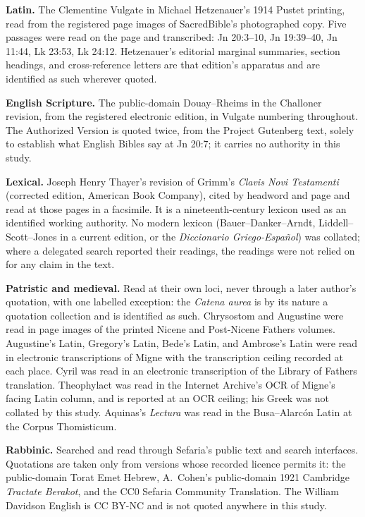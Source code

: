\textbf{Latin.} The Clementine Vulgate in Michael Hetzenauer's 1914 Pustet
printing, read from the registered page images of SacredBible's photographed
copy. Five passages were read on the page and transcribed: Jn 20:3--10, Jn
19:39--40, Jn 11:44, Lk 23:53, Lk 24:12. Hetzenauer's editorial marginal
summaries, section headings, and cross-reference letters are that edition's
apparatus and are identified as such wherever quoted.

\textbf{English Scripture.} The public-domain Douay--Rheims in the Challoner
revision, from the registered electronic edition, in Vulgate numbering
throughout. The Authorized Version is quoted twice, from the Project Gutenberg
text, solely to establish what English Bibles say at Jn 20:7; it carries no
authority in this study.

\textbf{Lexical.} Joseph Henry Thayer's revision of Grimm's \emph{Clavis Novi
Testamenti} (corrected edition, American Book Company), cited by headword and
page and read at those pages in a facsimile. It is a nineteenth-century lexicon
used as an identified working authority. No modern lexicon (Bauer--Danker--Arndt,
Liddell--Scott--Jones in a current edition, or the \emph{Diccionario
Griego-Espa\~nol}) was collated; where a delegated search reported their
readings, the readings were not relied on for any claim in the text.

\textbf{Patristic and medieval.} Read at their own loci, never through a later
author's quotation, with one labelled exception: the \emph{Catena aurea} is by
its nature a quotation collection and is identified as such. Chrysostom and
Augustine were read in page images of the printed Nicene and Post-Nicene
Fathers volumes. Augustine's Latin, Gregory's Latin, Bede's Latin, and Ambrose's
Latin were read in electronic transcriptions of Migne with the transcription
ceiling recorded at each place. Cyril was read in an electronic transcription of
the Library of Fathers translation. Theophylact was read in the Internet
Archive's OCR of Migne's facing Latin column, and is reported at an OCR ceiling;
his Greek was not collated by this study. Aquinas's \emph{Lectura} was read in
the Busa--Alarc\'on Latin at the Corpus Thomisticum.

\textbf{Rabbinic.} Searched and read through Sefaria's public text and search
interfaces. Quotations are taken only from versions whose recorded licence
permits it: the public-domain Torat Emet Hebrew, A.~Cohen's public-domain 1921
Cambridge \emph{Tractate Berakot}, and the CC0 Sefaria Community Translation.
The William Davidson English is CC BY-NC and is not quoted anywhere in this
study.

